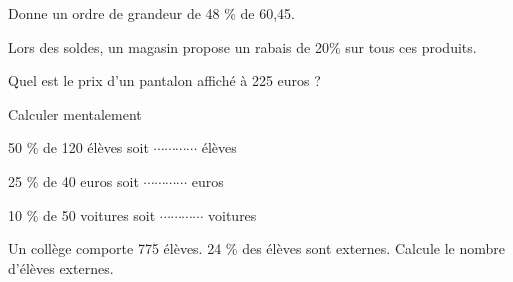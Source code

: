 Donne un ordre de grandeur de 48 \% de 60,45.




Lors des soldes, un magasin propose un rabais de 20\% sur tous ces produits.

Quel est le prix d'un pantalon affiché à 225 euros ?




Calculer mentalement 

\begin{description}
\item 50 \% de 120 élèves soit $\cdots\cdots\cdots\cdots$ élèves 
\item 25 \% de 40 euros  soit $\cdots\cdots\cdots\cdots$ euros 
\item 10 \% de 50 voitures soit $\cdots\cdots\cdots\cdots$ voitures 
\end{description}


 

Un collège comporte 775 élèves. 24 \% des élèves sont externes.
Calcule le nombre d'élèves externes.





